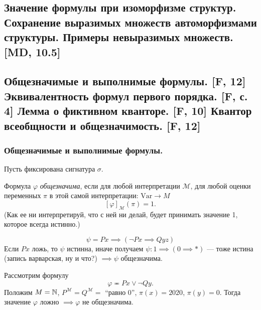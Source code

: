 \documentclass[a4paper, fleqn]{article}
\begin{document}
    \subsection{Значение формулы при изоморфизме структур. Сохранение выразимых множеств автоморфизмами структуры. Примеры невыразимых множеств. [MD, 10.5]}

    \subsection{Общезначимые и выполнимые формулы. [F, 12] Эквивалентность формул первого порядка. [F, с. 4] Лемма о фиктивном кванторе. [F, 10] Квантор всеобщности и общезначимость. [F, 12]}
    
    \subsubsection{Общезначимые и выполнимые формулы.}

    Пусть фиксирована сигнатура $\sigma$. 
    \begin{definition}
        Формула $\varphi$ {\it общезначима}, если для любой интерпретации $\mathcal{M}$, для 
        любой оценки переменных $\pi$ в этой самой интерпретации: $\text{Var} \to M$ 
        $$
            [\varphi]_{\mathcal{M}}(\pi) = 1.
        $$
        (Как ее ни интерпретируй, что с ней ни делай, будет принимать значение 1, 
        которое всегда истинно.)
    \end{definition}

    \begin{example}
        $$
            \psi = Px \implies (\neg Px \implies Qyz)
        $$
        Если $Px$ ложь, то $\psi$ истинна, иначе получаем $\psi \colon 1 \implies 
        (0 \implies *)$ --- тоже истина (запись варварская, ну и что?) $\implies 
        \psi $ общезначима. 
    \end{example}
    \begin{example}
        Рассмотрим формулу
        $$
            \varphi \eqcirc Px \lor \neg Qy.
        $$
        Положим $M = \mathbb{N}$, $P^{\mathcal{M}} = Q^{\mathcal{M}} =$ 
        ``равно 0'', $\pi(x) = 2020$, $\pi(y) = 0$.
        Тогда значение $\varphi$ ложно $ \implies \varphi $ не общезначима.
    \end{example}
\end{document}
